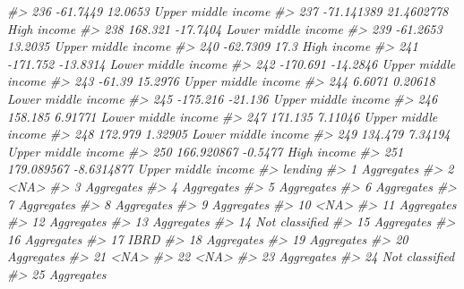 \documentclass[
  xelatex, ja=standard]{bxjsbook}
\newenvironment{Shaded}{\begin{snugshade}}{\end{snugshade}}
\newcommand{\CommentTok}[1]{\textcolor[rgb]{0.56,0.35,0.01}{\textit{#1}}}
\theoremstyle{definition}
\theoremstyle{definition}
\theoremstyle{definition}
\theoremstyle{definition}
\theoremstyle{remark}
\begin{document}
\begin{Shaded}
\begin{Highlighting}[]
\CommentTok{\#\textgreater{} 236   {-}61.7449    12.0653 Upper middle income}
\CommentTok{\#\textgreater{} 237 {-}71.141389 21.4602778         High income}
\CommentTok{\#\textgreater{} 238    168.321   {-}17.7404 Lower middle income}
\CommentTok{\#\textgreater{} 239   {-}61.2653    13.2035 Upper middle income}
\CommentTok{\#\textgreater{} 240   {-}62.7309       17.3         High income}
\CommentTok{\#\textgreater{} 241   {-}171.752   {-}13.8314 Lower middle income}
\CommentTok{\#\textgreater{} 242   {-}170.691   {-}14.2846 Upper middle income}
\CommentTok{\#\textgreater{} 243     {-}61.39    15.2976 Upper middle income}
\CommentTok{\#\textgreater{} 244     6.6071    0.20618 Lower middle income}
\CommentTok{\#\textgreater{} 245   {-}175.216    {-}21.136 Upper middle income}
\CommentTok{\#\textgreater{} 246    158.185    6.91771 Lower middle income}
\CommentTok{\#\textgreater{} 247    171.135    7.11046 Upper middle income}
\CommentTok{\#\textgreater{} 248    172.979    1.32905 Lower middle income}
\CommentTok{\#\textgreater{} 249    134.479    7.34194 Upper middle income}
\CommentTok{\#\textgreater{} 250 166.920867    {-}0.5477         High income}
\CommentTok{\#\textgreater{} 251 179.089567 {-}8.6314877 Upper middle income}
\CommentTok{\#\textgreater{}            lending}
\CommentTok{\#\textgreater{} 1       Aggregates}
\CommentTok{\#\textgreater{} 2             \textless{}NA\textgreater{}}
\CommentTok{\#\textgreater{} 3       Aggregates}
\CommentTok{\#\textgreater{} 4       Aggregates}
\CommentTok{\#\textgreater{} 5       Aggregates}
\CommentTok{\#\textgreater{} 6       Aggregates}
\CommentTok{\#\textgreater{} 7       Aggregates}
\CommentTok{\#\textgreater{} 8       Aggregates}
\CommentTok{\#\textgreater{} 9       Aggregates}
\CommentTok{\#\textgreater{} 10            \textless{}NA\textgreater{}}
\CommentTok{\#\textgreater{} 11      Aggregates}
\CommentTok{\#\textgreater{} 12      Aggregates}
\CommentTok{\#\textgreater{} 13      Aggregates}
\CommentTok{\#\textgreater{} 14  Not classified}
\CommentTok{\#\textgreater{} 15      Aggregates}
\CommentTok{\#\textgreater{} 16      Aggregates}
\CommentTok{\#\textgreater{} 17            IBRD}
\CommentTok{\#\textgreater{} 18      Aggregates}
\CommentTok{\#\textgreater{} 19      Aggregates}
\CommentTok{\#\textgreater{} 20      Aggregates}
\CommentTok{\#\textgreater{} 21            \textless{}NA\textgreater{}}
\CommentTok{\#\textgreater{} 22            \textless{}NA\textgreater{}}
\CommentTok{\#\textgreater{} 23      Aggregates}
\CommentTok{\#\textgreater{} 24  Not classified}
\CommentTok{\#\textgreater{} 25      Aggregates}

\end{Highlighting}
\end{Shaded}
\end{document}
